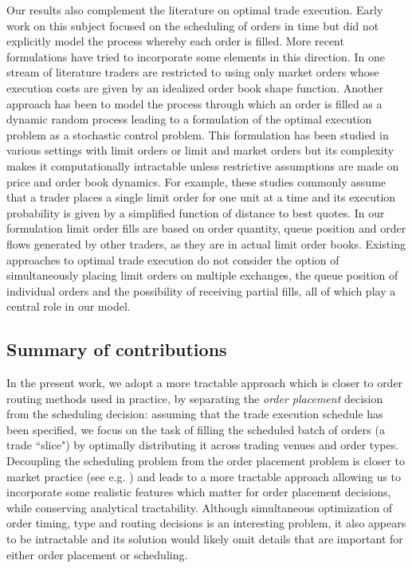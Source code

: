 \documentclass[opre,nonblindrev]{informs3}
\begin{document}
Our results also complement the literature on optimal trade execution. Early work on this subject \citep{bertsimas98,almgren00} focused on the scheduling of orders in time but did not explicitly model the process whereby each order is filled. More recent formulations have tried to incorporate some elements in this direction. In one stream of literature \citep{obizhaeva05,Alfonsi2010,Predoiu2011} traders are restricted to using only market orders whose execution costs are given by an idealized order book shape function. Another approach has been to model the process through which an order is filled as a dynamic random process \citep{Cont2011, Cont2011b} leading to a formulation of the optimal execution problem as a stochastic control problem. This formulation has been studied in various settings with limit orders \citep{Bayraktar2011, Gueant2012} or limit and market orders \citep{Guilbaud2012, Huitema2012, Guo2013, Li2013} but its complexity  makes it computationally intractable unless restrictive assumptions are made on price and order book dynamics. For example, these studies commonly assume that a trader places a single limit order for one unit at a time and its execution probability is given by a simplified function of distance to best quotes. In our formulation limit order fills are based on order quantity, queue position and order flows generated by other traders, as they are in actual limit order books. Existing approaches to optimal trade execution do not consider the option of simultaneously placing limit orders on multiple exchanges, the queue position of individual orders and the possibility of receiving partial fills, all of which play a central role in our model.

\subsection{Summary of contributions}
In the present work, we adopt a  more tractable approach which is closer to order routing  methods used in  practice, by separating the {\it order placement} decision from the scheduling decision: assuming that the trade execution schedule has been specified, we focus on the task of filling the scheduled batch of orders (a trade ``slice") by optimally distributing it across trading venues and order types. Decoupling the scheduling problem from the order placement problem is closer to market practice (see e.g. \cite{almgrenharts}) and leads to a more tractable approach allowing us to incorporate some realistic features which matter  for order placement decisions, while conserving analytical tractability. Although simultaneous optimization of order timing, type and routing decisions is an interesting problem, it also appears to be intractable and its solution would likely omit details that are important for either order placement or scheduling. 
\end{document}
